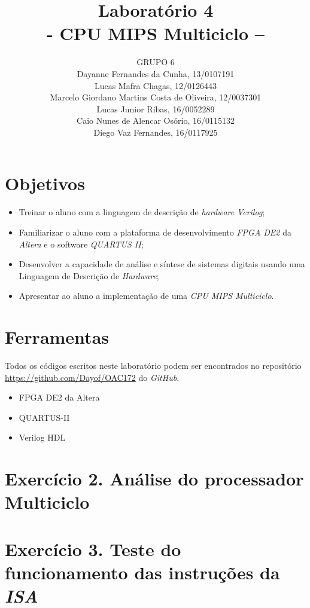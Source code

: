 \documentclass[12pt]{article}
\title{Laboratório 4\\- CPU MIPS Multiciclo –}
\author{GRUPO 6\\
	Dayanne Fernandes da Cunha, 13/0107191\\
	Lucas Mafra Chagas, 12/0126443\\
	Marcelo Giordano Martins Costa de Oliveira, 12/0037301\\
	Lucas Junior Ribas, 16/0052289\\
	Caio Nunes de Alencar Osório, 16/0115132\\
	Diego Vaz Fernandes, 16/0117925}
\begin{document}
\maketitle

\section{Objetivos}
\label{sec:Objetivos}

\begin{itemize}
\item Treinar o aluno com a linguagem de descrição de \textit{hardware} \textit{Verilog};
\item Familiarizar o aluno com a plataforma de desenvolvimento \textit{FPGA DE2} da \textit{Altera} e o software \textit{QUARTUS II};
\item Desenvolver a capacidade de análise e síntese de sistemas digitais usando uma Linguagem de Descrição de \textit{Hardware};
\item Apresentar ao aluno a implementação de uma \textit{CPU MIPS Multiciclo}.
\end{itemize}

\section{Ferramentas}
\label{sec:Materiais}

Todos os códigos escritos neste laboratório podem ser encontrados no repositório \url{https://github.com/Dayof/OAC172} do \textit{GitHub}.

\begin{itemize}
\item FPGA DE2 da Altera 
\item QUARTUS-II
\item Verilog HDL
\end{itemize}

\section{Exercício 2. Análise do processador Multiciclo}
\label{sec:multiciclo}


\section{Exercício 3. Teste do funcionamento das instruções da \textit{ISA} }
\label{sec:testeisa}
\end{document}
